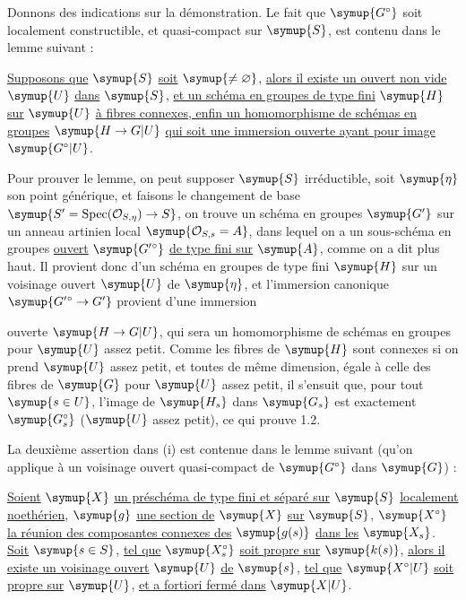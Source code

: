 Donnons des indications sur la démonstration. Le fait que $\symup{G^\circ}$ soit
localement constructible, et quasi-compact sur $\symup{S}$, est contenu dans le lemme
suivant :

 \uline{Supposons que} $\symup{S}$ \uline{soit} $\symup{\neq\varnothing}$, \uline{alors il existe un ouvert
non vide} $\symup{U}$ \uline{dans} $\symup{S}$, \uline{et un schéma en groupes de type fini} $\symup{H}$ \uline{sur} $\symup{U}$ \uline{à
fibres connexes, enfin un homomorphisme de schémas en groupes}
$\symup{H\to G|U}$ \uline{qui soit une immersion ouverte ayant pour image}
$\symup{G^\circ|U}$.

Pour prouver le lemme, on peut supposer $\symup{S}$ irréductible, soit $\symup{\eta}$ son point
générique, et faisons le changement de base
$\symup{S'=\operatorname{Spec}(\mathcal O_{S,\eta})\to S}$, on trouve un
schéma en groupes $\symup{G'}$ sur un anneau artinien local
$\symup{\mathcal O_{S,s}=A}$, dans lequel on a un sous-schéma en groupes \uline{ouvert}
$\symup{G'{}^\circ}$ \uline{de type fini sur} $\symup{A}$, comme on a dit plus haut. Il provient donc
d'un schéma en groupes de type fini $\symup{H}$ sur un voisinage ouvert $\symup{U}$ de $\symup{\eta}$,
et l'immersion canonique $\symup{G'{}^\circ\to G'}$ provient d'une
immersion

ouverte $\symup{H\to G|U}$, qui sera un homomorphisme de schémas en groupes
pour $\symup{U}$ assez petit. Comme les fibres de $\symup{H}$ sont connexes si on prend $\symup{U}$
assez petit, et toutes de même dimension, égale à celle des fibres de $\symup{G}$ pour
$\symup{U}$ assez petit, il s'ensuit que, pour tout $\symup{s\in U}$, l'image de $\symup{H_s}$ dans
$\symup{G_s}$ est exactement $\symup{G_s^\circ}$ ($\symup{U}$ assez petit), ce qui prouve 1.2.

La deuxième assertion dans (i) est contenue dans le lemme suivant (qu'on
applique à un voisinage ouvert quasi-compact de $\symup{G^\circ}$ dans $\symup{G}$) :

 \uline{Soient} $\symup{X}$ \uline{un préschéma de type fini et séparé sur} $\symup{S}$
\uline{localement noethérien}, $\symup{g}$ \uline{une section de} $\symup{X}$ \uline{sur} $\symup{S}$, $\symup{X^\circ}$ \uline{la réunion des
composantes connexes des} $\symup{g(s)}$ \uline{dans les} $\symup{X_s}$. \uline{Soit} $\symup{s\in S}$, \uline{tel que}
$\symup{X_s^\circ}$ \uline{soit propre sur} $\symup{k(s)}$, \uline{alors il existe un voisinage ouvert} $\symup{U}$ \uline{de}
$\symup{s}$, \uline{tel que} $\symup{X^\circ|U}$ \uline{soit propre sur} $\symup{U}$, \uline{et a fortiori fermé dans} $\symup{X|U}$.

